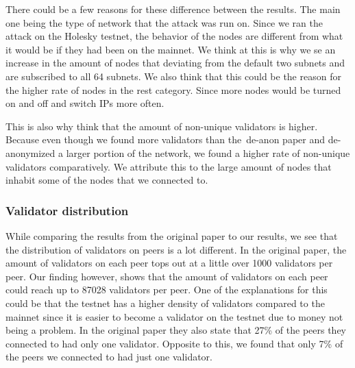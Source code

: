 There could be a few reasons for these difference between the results.
The main one being the type of network that the attack was run on.
Since we ran the attack on the Holesky testnet, the behavior of the nodes are different from what it would be if they had been on the mainnet.
We think at this is why we se an increase in the amount of nodes that deviating from the default two subnets and are subscribed to all 64 subnets.
We also think that this could be the reason for the higher rate of nodes in the rest category.
Since more nodes would be turned on and off and switch IPs more often.


This is also why think that the amount of non-unique validators is higher.
Because even though we found more validators than the~\gls{de-anon paper} and de-anonymized a larger portion of the network, we found a higher rate of non-unique validators comparatively.
We attribute this to the large amount of nodes that inhabit some of the nodes that we connected to.



\subsubsection{Validator distribution}\label{subsubsec:validator-distribution}
While comparing the results from the original paper to our results, we see that the distribution of validators on peers is a lot different.
In the original paper, the amount of validators on each peer tops out at a little over 1000 validators per peer.
Our finding however, shows that the amount of validators on each peer could reach up to 87028 validators per peer.
One of the explanations for this could be that the testnet has a higher density of validators compared to the mainnet since it is easier to become a validator on the testnet due to money not being a problem.
In the original paper they also state that 27\% of the peers they connected to had only one validator.
Opposite to this, we found that only 7\% of the peers we connected to had just one validator.

